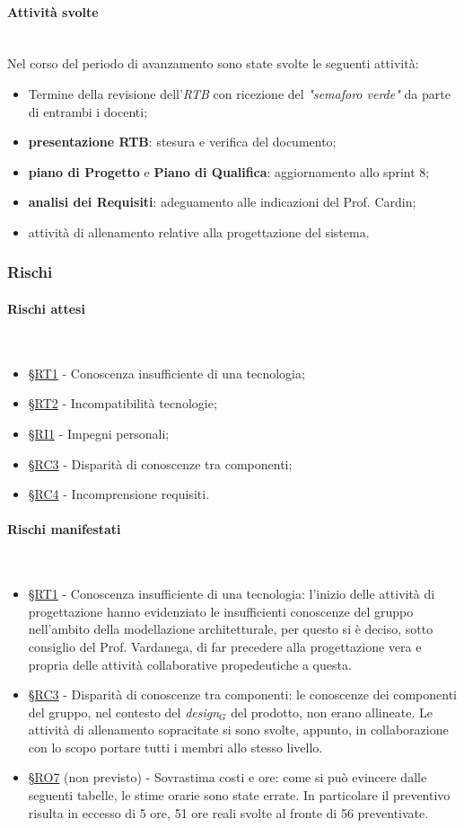 \documentclass[10pt, letterpaper]{article}
\newcommand{\trisubsection}[1]{\paragraph{#1}\mbox{}\\}
\newcommand{\rif}[1]{\hyperref[#1]{§#1}}
\begin{document}
\trisubsection{Attività svolte}
Nel corso del periodo di avanzamento sono state svolte le seguenti attività:
\begin{itemize}
    \item Termine della revisione dell'\textit{RTB} con ricezione del \textit{"semaforo verde"} da parte di entrambi i docenti;
    \item \textbf{presentazione RTB}: stesura e verifica del documento;
    \item \textbf{piano di Progetto} e \textbf{Piano di Qualifica}: aggiornamento allo sprint 8;
    \item \textbf{analisi dei Requisiti}: adeguamento alle indicazioni del Prof. Cardin;
    \item attività di allenamento relative alla progettazione del sistema.
\end{itemize}

\subsubsection{Rischi}
\trisubsection{Rischi attesi}
\begin{itemize}
    \item \rif{RT1} - Conoscenza insufficiente di una tecnologia;
    \item \rif{RT2} - Incompatibilità tecnologie;
    \item \rif{RI1} - Impegni personali;
    \item \rif{RC3} - Disparità di conoscenze tra componenti;
    \item \rif{RC4} - Incomprensione requisiti.
\end{itemize}
\trisubsection{Rischi manifestati}
\begin{itemize}
    \item \rif{RT1} - Conoscenza insufficiente di una tecnologia: l'inizio delle attività di progettazione hanno evidenziato le insufficienti conoscenze del gruppo nell'ambito della modellazione architetturale, per questo si è deciso, sotto consiglio del Prof. Vardanega, di far precedere alla progettazione vera e propria delle attività collaborative propedeutiche a questa. 
    \item \rif{RC3} - Disparità di conoscenze tra componenti: le conoscenze dei componenti del gruppo, nel contesto del \textit{design$_{G}$} del prodotto, non erano allineate. Le attività di allenamento sopracitate si sono svolte, appunto, in collaborazione con lo scopo portare tutti i membri allo stesso livello.
    \item \rif{RO7} (non previsto) - Sovrastima costi e ore: come si può evincere dalle seguenti tabelle, le stime orarie sono state errate. In particolare il preventivo risulta in eccesso di 5 ore, 51 ore reali svolte al fronte di 56 preventivate.
\end{itemize}
\end{document}
